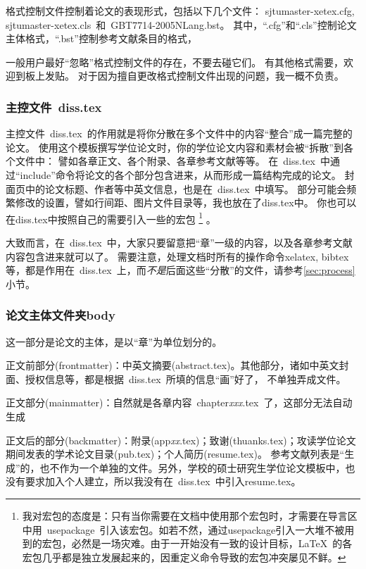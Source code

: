 格式控制文件控制着论文的表现形式，包括以下几个文件：
sjtumaster-xetex.cfg, sjtumaster-xetex.cls~和~GBT7714-2005NLang.bst。
其中，``.cfg''和``.cls''控制论文主体格式，``.bst''控制参考文献条目的格式，

一般用户最好``忽略''格式控制文件的存在，不要去碰它们。
有其他格式需要，欢迎到板上发贴。
对于因为擅自更改格式控制文件出现的问题，我一概不负责。{\large\smiley}

\subsubsection{主控文件~diss.tex}
\label{sec:disstex}

主控文件~diss.tex~的作用就是将你分散在多个文件中的内容``整合''成一篇完整的论文。
使用这个模板撰写学位论文时，你的学位论文内容和素材会被``拆散''到各个文件中：
譬如各章正文、各个附录、各章参考文献等等。
在~diss.tex~中通过``include''命令将论文的各个部分包含进来，从而形成一篇结构完成的论文。
封面页中的论文标题、作者等中英文信息，也是在~diss.tex~中填写。
部分可能会频繁修改的设置，譬如行间距、图片文件目录等，我也放在了diss.tex中。
你也可以在diss.tex中按照自己的需要引入一些的宏包
\footnote{我对宏包的态度是：只有当你需要在文档中使用那个宏包时，才需要在导言区中用~usepackage~引入该宏包。如若不然，通过usepackage引入一大堆不被用到的宏包，必然是一场灾难。由于一开始没有一致的设计目标，\LaTeX~的各宏包几乎都是独立发展起来的，因重定义命令导致的宏包冲突屡见不鲜。}
。

大致而言，在~diss.tex~中，大家只要留意把``章''一级的内容，以及各章参考文献内容包含进来就可以了。
需要注意，处理文档时所有的操作命令{}\cndash{}xelatex, bibtex等，都是作用在~diss.tex~上，而\emph{不是}后面这些``分散''的文件，请参考\ref{sec:process}小节。

\subsubsection{论文主体文件夹body}
\label{sec:thesisbody}

这一部分是论文的主体，是以``章''为单位划分的。

正文前部分(frontmatter)：中英文摘要(abstract.tex)。其他部分，诸如中英文封面、授权信息等，都是根据~diss.tex~所填的信息``画''好了，
不单独弄成文件。

正文部分(mainmatter)：自然就是各章内容~chapter\emph{xxx}.tex~了，这部分无法自动生成{\LARGE\Smiley}

正文后的部分(backmatter)：附录(app\emph{xx}.tex)；致谢(thuanks.tex)；攻读学位论文期间发表的学术论文目录(pub.tex)；个人简历(resume.tex)。
参考文献列表是``生成''的，也不作为一个单独的文件。另外，学校的硕士研究生学位论文模板中，也没有要求加入个人建立，所以我没有在~diss.tex~中引入resume.tex。

